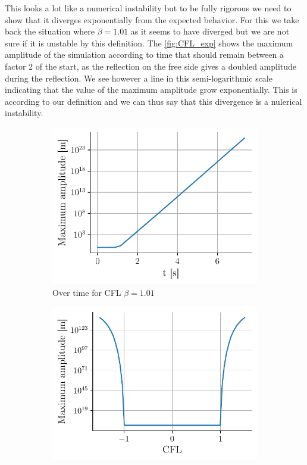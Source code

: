 This looks a lot like a numerical instability but to be fully rigorous we need to show that it diverges exponentially from the expected behavior. For this we take back the situation where $\beta = 1.01$ as it seems to have diverged but we are not sure if it is unstable by this definition. The \autoref{fig:CFL_exp} shows the maximum amplitude of the simulation according to time that should remain between a factor 2 of the start, as the reflection on the free side gives a doubled amplitude during the reflection. We see however a line in this semi-logarithmic scale indicating that the value of the maximum amplitude grow exponentially. This is according to our definition and we can thus say that this divergence is a nulerical instability.
\begin{figure}
    \centering
    \begin{subfigure}{0.48\linewidth}
        \centering
        \includegraphics*[width=\linewidth]{figures/bassin_default_CFL_exponential.pdf}
        \caption{Over time for CFL $\beta = 1.01$}
        \label{fig:CFL_exp}
    \end{subfigure}
    \begin{subfigure}{0.48\linewidth}
        \centering
        \includegraphics[width=\linewidth]{figures/bassin_default_CFL_stability.pdf}

\end{subfigure}
\end{figure}

